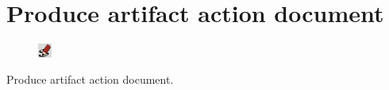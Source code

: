 \documentclass[11pt,oneside]{book}
\begin{document}
\section{Produce artifact action document}
\begin{shadebox}
\begin{figure}
\vspace{-15pt}\hspace{-10pt}
    \includegraphics[width=0.04\textwidth]{note-icon}
\end{figure}
Produce artifact action document.
\end{shadebox}

\end{document}
